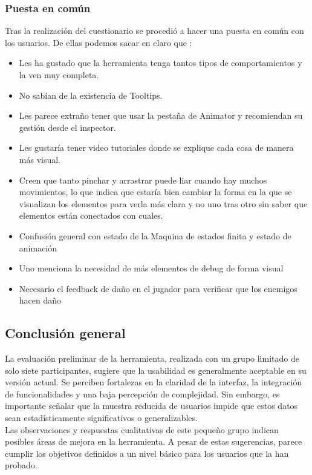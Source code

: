 \subsubsection{Puesta en común}
Tras la realización del cuestionario se procedió a hacer una puesta en común con los usuarios. De ellas podemos sacar en claro que :
\begin{itemize}
\item Les ha gustado que la herramienta tenga tantos tipos de comportamientos y la ven muy completa.
\item No sabían de la existencia de Tooltips.
\item Les parece extraño tener que usar la pestaña de Animator y recomiendan su gestión desde el inspector.
\item Les gustaría tener video tutoriales donde se explique cada cosa de manera más visual.
\item Creen que tanto pinchar y arrastrar puede liar cuando hay muchos movimientos, lo que indica que estaría bien cambiar la forma en la que se visualizan los elementos para verla más clara y no uno tras otro sin saber que elementos están conectados con cuales.
\item Confusión general con estado de la Maquina de estados finita y estado de animación
\item Uno menciona la necesidad de más elementos de debug de forma visual
\item Necesario el feedback de daño en el jugador para verificar que los enemigos hacen daño
\end{itemize}
\subsection{Conclusión general}

La evaluación preliminar de la herramienta, realizada con un grupo limitado de solo siete participantes, sugiere que la usabilidad es generalmente aceptable en su versión actual. Se perciben fortalezas en la claridad de la interfaz, la integración de funcionalidades y una baja percepción de complejidad. Sin embargo, es importante señalar que la muestra reducida de usuarios impide que estos datos sean estadísticamente significativos o generalizables.\\

Las observaciones y respuestas cualitativas de este pequeño grupo indican posibles áreas de mejora en la herramienta. A pesar de estas sugerencias, parece cumplir los objetivos definidos a un nivel básico para los usuarios que la han probado.

